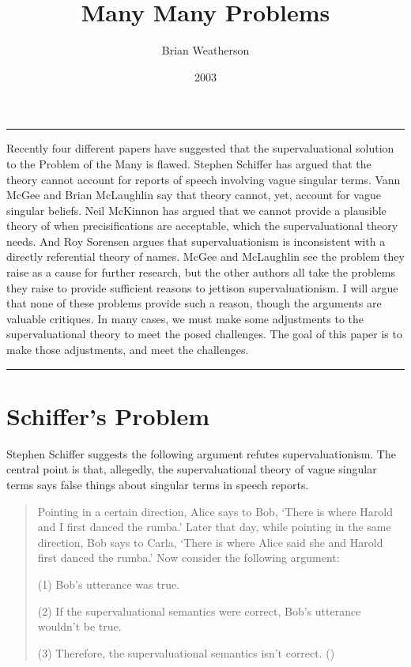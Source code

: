 \documentclass[
  10pt,
  letterpaper,
  DIV=11,
  numbers=noendperiod,
  twoside]{scrartcl}
\title{Many Many Problems}
\author{Brian Weatherson}
\date{2003}
\renewenvironment{abstract}
 {\vspace{-1.25cm}
 \quotation\small\noindent\rule{\linewidth}{.5pt}\par\smallskip
 \noindent }
 {\par\noindent\rule{\linewidth}{.5pt}\endquotation}
\begin{document}
\maketitle
\begin{abstract}
Recently four different papers have suggested that the supervaluational
solution to the Problem of the Many is flawed. Stephen Schiffer has
argued that the theory cannot account for reports of speech involving
vague singular terms. Vann McGee and Brian McLaughlin say that theory
cannot, yet, account for vague singular beliefs. Neil McKinnon has
argued that we cannot provide a plausible theory of when
precisifications are acceptable, which the supervaluational theory
needs. And Roy Sorensen argues that supervaluationism is inconsistent
with a directly referential theory of names. McGee and McLaughlin see
the problem they raise as a cause for further research, but the other
authors all take the problems they raise to provide sufficient reasons
to jettison supervaluationism. I will argue that none of these problems
provide such a reason, though the arguments are valuable critiques. In
many cases, we must make some adjustments to the supervaluational theory
to meet the posed challenges. The goal of this paper is to make those
adjustments, and meet the challenges.
\end{abstract}

\section{Schiffer's Problem}\label{schiffers-problem}

Stephen Schiffer suggests the following argument refutes
supervaluationism. The central point is that, allegedly, the
supervaluational theory of vague singular terms says false things about
singular terms in speech reports.

\begin{quote}
Pointing in a certain direction, Alice says to Bob, `There is where
Harold and I first danced the rumba.' Later that day, while pointing in
the same direction, Bob says to Carla, `There is where Alice said she
and Harold first danced the rumba.' Now consider the following argument:

(1) Bob's utterance was true.

(2) If the supervaluational semantics were correct, Bob's utterance
wouldn't be true.

(3) Therefore, the supervaluational semantics isn't correct.
()
\end{quote}
\end{document}
